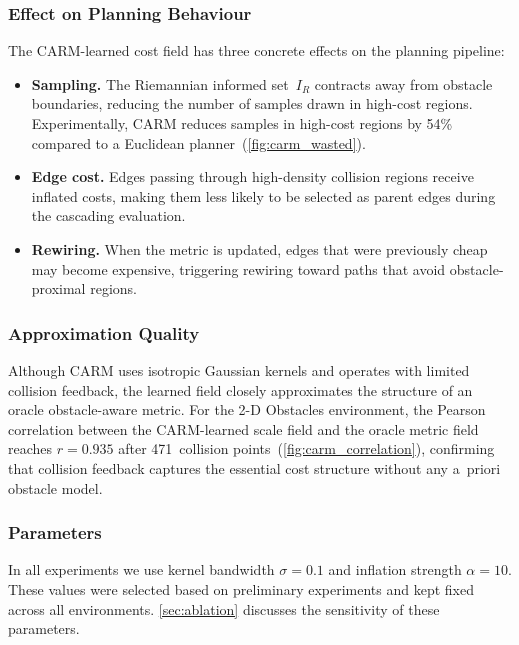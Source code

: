 \documentclass[journal]{IEEEtran}
\newcommand{\IR}{I_{\!R}}
\begin{document}
\subsubsection{Effect on Planning Behaviour}

The CARM-learned cost field has three concrete effects on the
planning pipeline:
\begin{itemize}
  \item \textbf{Sampling.}
    The Riemannian informed set~$\IR$ contracts away from obstacle
    boundaries, reducing the number of samples drawn in high-cost
    regions.
    Experimentally, CARM reduces samples in high-cost regions by
    54\% compared to a Euclidean planner~(\cref{fig:carm_wasted}).
  \item \textbf{Edge cost.}
    Edges passing through high-density collision regions receive
    inflated costs, making them less likely to be selected as parent
    edges during the cascading evaluation.
  \item \textbf{Rewiring.}
    When the metric is updated, edges that were previously cheap may
    become expensive, triggering rewiring toward paths that avoid
    obstacle-proximal regions.
\end{itemize}

\subsubsection{Approximation Quality}

Although CARM uses isotropic Gaussian kernels and operates with
limited collision feedback, the learned field closely approximates
the structure of an oracle obstacle-aware metric.
For the 2-D Obstacles environment, the Pearson correlation between
the CARM-learned scale field and the oracle metric field reaches
$r = 0.935$ after 471~collision points~(\cref{fig:carm_correlation}),
confirming that collision feedback captures the essential cost
structure without any a~priori obstacle model.

\subsubsection{Parameters}

In all experiments we use kernel bandwidth $\sigma = 0.1$ and
inflation strength $\alpha = 10$.
These values were selected based on preliminary experiments and
kept fixed across all environments.
\cref{sec:ablation} discusses the sensitivity of these parameters.
\end{document}
